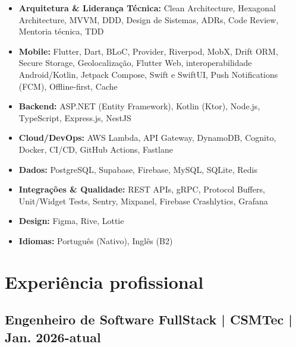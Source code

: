 \documentclass[11pt,a4paper]{article}
\begin{document}
\begin{itemize}[leftmargin=*, itemsep=1pt]
    \item \textbf{Arquitetura \& Lideran\c{c}a T\'ecnica:} Clean Architecture, Hexagonal Architecture, MVVM, DDD, Design de Sistemas, ADRs, Code Review, Mentoria técnica, TDD
    \item \textbf{Mobile:} Flutter, Dart, BLoC, Provider, Riverpod, MobX, Drift ORM, Secure Storage, Geolocalização, Flutter Web, interoperabilidade Android/Kotlin, Jetpack Compose, Swift e SwiftUI, Push Notifications (FCM), Offline-first, Cache
    \item \textbf{Backend:} ASP.NET (Entity Framework), Kotlin (Ktor), Node.js, TypeScript, Express.js, NestJS
    \item \textbf{Cloud/DevOps:} AWS Lambda, API Gateway, DynamoDB, Cognito, Docker, CI/CD, GitHub Actions, Fastlane
    \item \textbf{Dados:} PostgreSQL, Supabase, Firebase, MySQL, SQLite, Redis
    \item \textbf{Integrações \& Qualidade:} REST APIs, gRPC, Protocol Buffers, Unit/Widget Tests, Sentry, Mixpanel, Firebase Crashlytics, Grafana
    \item \textbf{Design:} Figma, Rive, Lottie
    \item \textbf{Idiomas:} Português (Nativo), Inglês (B2)
\end{itemize}

\section*{Experiência profissional}

\subsection*{Engenheiro de Software FullStack | CSMTec | Jan. 2026-atual}
\end{document}
